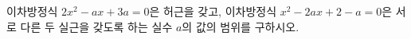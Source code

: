 \hspace*{2mm}\begin{minipage}[t]{\dimexpr\linewidth-2mm\relax}\vspace{0pt}
이차방정식 $2x^2-ax+3a=0$은 허근을 갖고, 이차방정식 $x^2-2ax+2-a=0$은 서로 다른 두 실근을 갖도록 하는 실수 $a$의 값의 범위를 구하시오.\end{minipage}
